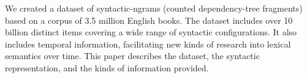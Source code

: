 We created a dataset of syntactic-ngrams (counted dependency-tree fragments) based on a corpus of 3.5 million English books. 
    The dataset includes over 10 billion distinct items covering a wide range of
 syntactic configurations.
    It also includes temporal information,
    facilitating new kinds of research into lexical semantics over time. 
    This paper describes the dataset, the syntactic representation, and the
 kinds of information provided.

